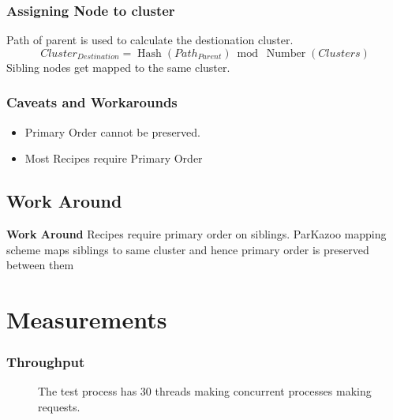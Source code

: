\documentclass[10pt, compress]{beamer}
\DeclareMathOperator{\Hash}{Hash}
\DeclareMathOperator{\Number}{Number}
\begin{document}
\begin{frame}[fragile]
    \frametitle{Assigning Node to cluster}
    Path of parent is used to calculate the destionation cluster.
    \begin{equation}
        Cluster_{Destination} = \Hash(Path_{Parent})\bmod \Number(Clusters)
    \end{equation}
    Sibling nodes get mapped to the same cluster.
\end{frame}

\begin{frame}
    \frametitle{Caveats and Workarounds}
    \begin{itemize}
        \item Primary Order cannot be preserved.
        \item Most Recipes require Primary Order
    \end{itemize}
    \subsection{Work Around}{
        \textbf{Work Around}
        Recipes require primary order on siblings. ParKazoo mapping scheme maps siblings to same cluster and hence primary order is preserved between them
    }
\end{frame}

\section{Measurements}
\begin{frame}
    \frametitle{Throughput}
    \begin{figure}
    \caption {The test process has 30 threads making concurrent processes making requests.}
  \end{figure}
\end{frame}
\end{document}
